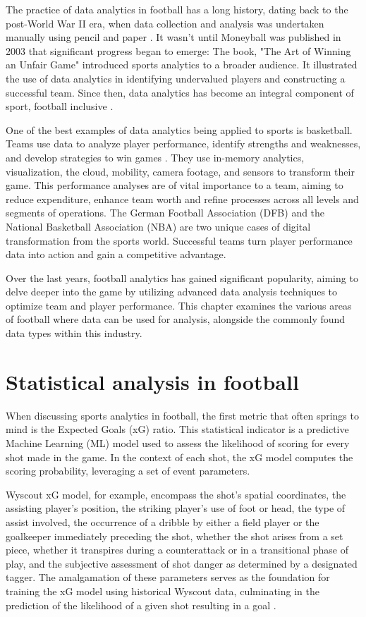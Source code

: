 \documentclass[twoside,nohyper]{tufte-book}
\begin{document}
The practice of data analytics in football has a long history, dating
back to the post-World War II era, when data collection and analysis was
undertaken manually using pencil and paper \citep{1}. It wasn't until
Moneyball was published in 2003 that significant progress began to
emerge: The book, "The Art of Winning an Unfair Game" introduced
sports analytics to a broader audience. It illustrated the use of data
analytics in identifying undervalued players and constructing a
successful team. Since then, data analytics has become an integral
component of sport, football inclusive \citep{1}.

One of the best examples of data analytics being applied to sports is
basketball. Teams use data to analyze player performance, identify
strengths and weaknesses, and develop strategies to win games \citep{2}. They
use in-memory analytics, visualization, the cloud, mobility, camera
footage, and sensors to transform their game. This performance analyses
are of vital importance to a team, aiming to reduce expenditure, enhance
team worth and refine processes across all levels and segments of
operations. The German Football Association (DFB) and the National
Basketball Association (NBA) are two unique cases of digital
transformation from the sports world. Successful teams turn player
performance data into action and gain a competitive advantage.

Over the last years, football analytics has gained significant
popularity, aiming to delve deeper into the game by utilizing advanced
data analysis techniques to optimize team and player performance. This
chapter examines the various areas of football where data can be used
for analysis, alongside the commonly found data types within this
industry.

\hypertarget{statistical-analysis-in-football}{%
\section{Statistical analysis in football}\label{statistical-analysis-in-football}}

When discussing sports analytics in football, the first metric that
often springs to mind is the Expected Goals (xG) ratio. This statistical
indicator is a predictive Machine Learning (ML) model used to assess the
likelihood of scoring for every shot made in the game. In the context of
each shot, the xG model computes the scoring probability, leveraging a
set of event parameters.

Wyscout xG model, for example, encompass the shot's spatial coordinates,
the assisting player's position, the striking player's use of foot or
head, the type of assist involved, the occurrence of a dribble by either
a field player or the goalkeeper immediately preceding the shot, whether
the shot arises from a set piece, whether it transpires during a
counterattack or in a transitional phase of play, and the subjective
assessment of shot danger as determined by a designated tagger. The
amalgamation of these parameters serves as the foundation for training
the xG model using historical Wyscout data, culminating in the
prediction of the likelihood of a given shot resulting in a goal
\citep{wyscout}.
\end{document}
